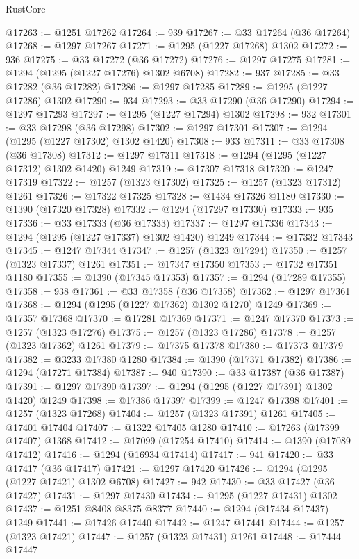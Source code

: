 \begin{lexlean}{RustCore}
\begin{coremodule}
@17263 := @1251 @17262
@17264 := 939
@17267 := @33 @17264 (@36 @17264)
@17268 := @1297 @17267
@17271 := @1295 (@1227 @17268) @1302
@17272 := 936
@17275 := @33 @17272 (@36 @17272)
@17276 := @1297 @17275
@17281 := @1294 (@1295 (@1227 @17276) @1302 @6708)
@17282 := 937
@17285 := @33 @17282 (@36 @17282)
@17286 := @1297 @17285
@17289 := @1295 (@1227 @17286) @1302
@17290 := 934
@17293 := @33 @17290 (@36 @17290)
@17294 := @1297 @17293
@17297 := @1295 (@1227 @17294) @1302
@17298 := 932
@17301 := @33 @17298 (@36 @17298)
@17302 := @1297 @17301
@17307 := @1294 (@1295 (@1227 @17302) @1302 @1420)
@17308 := 933
@17311 := @33 @17308 (@36 @17308)
@17312 := @1297 @17311
@17318 := @1294 (@1295 (@1227 @17312) @1302 @1420) @1249
@17319 := @17307 @17318
@17320 := @1247 @17319
@17322 := @1257 (@1323 @17302)
@17325 := @1257 (@1323 @17312) @1261
@17326 := @17322 @17325
@17328 := @1434 @17326 @1180
@17330 := @1390 (@17320 @17328)
@17332 := @1294 (@17297 @17330)
@17333 := 935
@17336 := @33 @17333 (@36 @17333)
@17337 := @1297 @17336
@17343 := @1294 (@1295 (@1227 @17337) @1302 @1420) @1249
@17344 := @17332 @17343
@17345 := @1247 @17344
@17347 := @1257 (@1323 @17294)
@17350 := @1257 (@1323 @17337) @1261
@17351 := @17347 @17350
@17353 := @1732 @17351 @1180
@17355 := @1390 (@17345 @17353)
@17357 := @1294 (@17289 @17355)
@17358 := 938
@17361 := @33 @17358 (@36 @17358)
@17362 := @1297 @17361
@17368 := @1294 (@1295 (@1227 @17362) @1302 @1270) @1249
@17369 := @17357 @17368
@17370 := @17281 @17369
@17371 := @1247 @17370
@17373 := @1257 (@1323 @17276)
@17375 := @1257 (@1323 @17286)
@17378 := @1257 (@1323 @17362) @1261
@17379 := @17375 @17378
@17380 := @17373 @17379
@17382 := @3233 @17380 @1280
@17384 := @1390 (@17371 @17382)
@17386 := @1294 (@17271 @17384)
@17387 := 940
@17390 := @33 @17387 (@36 @17387)
@17391 := @1297 @17390
@17397 := @1294 (@1295 (@1227 @17391) @1302 @1420) @1249
@17398 := @17386 @17397
@17399 := @1247 @17398
@17401 := @1257 (@1323 @17268)
@17404 := @1257 (@1323 @17391) @1261
@17405 := @17401 @17404
@17407 := @1322 @17405 @1280
@17410 := @17263 (@17399 @17407) @1368
@17412 := @17099 (@17254 @17410)
@17414 := @1390 (@17089 @17412)
@17416 := @1294 (@16934 @17414)
@17417 := 941
@17420 := @33 @17417 (@36 @17417)
@17421 := @1297 @17420
@17426 := @1294 (@1295 (@1227 @17421) @1302 @6708)
@17427 := 942
@17430 := @33 @17427 (@36 @17427)
@17431 := @1297 @17430
@17434 := @1295 (@1227 @17431) @1302
@17437 := @1251 @8408 @8375 @8377
@17440 := @1294 (@17434 @17437) @1249
@17441 := @17426 @17440
@17442 := @1247 @17441
@17444 := @1257 (@1323 @17421)
@17447 := @1257 (@1323 @17431) @1261
@17448 := @17444 @17447

\end{coremodule}
\end{lexlean}
